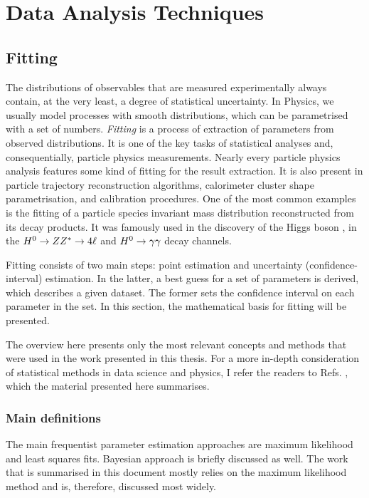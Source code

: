\chapter{Data Analysis Techniques}

\section{Fitting}

The distributions of observables that are measured experimentally always contain, at the very least, a degree of statistical uncertainty.
In Physics, we usually model processes with smooth distributions, which can be parametrised with a set of numbers. 
\textit{Fitting} is a process of extraction of parameters from observed distributions. 
It is one of the key tasks of statistical analyses and, consequentially, particle physics measurements. 
Nearly every particle physics analysis features some kind of fitting for the result extraction. 
It is also present in particle trajectory reconstruction algorithms, calorimeter cluster shape parametrisation, and calibration procedures.
One of the most common examples is the fitting of a particle species invariant mass distribution reconstructed from its decay products.
It was famously used in the discovery of the Higgs boson \cite{ATLAS:2012yve,CMS:2012qbp}, in the  $H^0\rightarrow ZZ^{*}\rightarrow 4\ell$ and $H^0\rightarrow\gamma\gamma$ decay channels.

Fitting consists of two main steps: point estimation and uncertainty (confidence-interval) estimation. 
In the latter, a best guess for a set of parameters is derived, which describes a given dataset.
The former sets the confidence interval on each parameter in the set. 
In this section, the mathematical basis for fitting will be presented.

The overview here presents only the most relevant concepts and methods that were used in the work presented in this thesis. 
For a more in-depth consideration of statistical methods in data science and physics, I refer the readers to Refs. \cite{Behnke:2013pga,Blobel_Lohrmann_1998,Bohm:2014vmk}, which the material presented here summarises.
\subsection{Main definitions}


The main frequentist parameter estimation approaches are maximum likelihood and least squares fits. 
Bayesian approach is briefly discussed as well.
The work that is summarised in this document mostly relies on the maximum likelihood method and is, therefore, discussed most widely.

